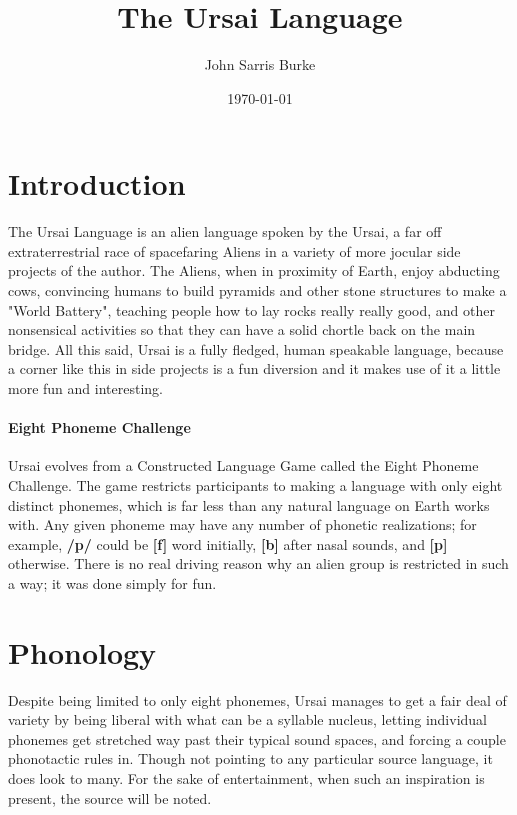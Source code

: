 \documentclass[11pt,letterpaper]{article}
\title{The Ursai Language}
\date{\today}
\author{John Sarris Burke}
\begin{document}
\maketitle
\tableofcontents
\pagebreak
\listoffigures
\pagebreak

\section{Introduction}
	The Ursai Language is an alien language spoken by the Ursai, a far off extraterrestrial race of spacefaring Aliens in a variety of more jocular side projects of the author.  The Aliens, when in proximity of Earth, enjoy abducting cows, convincing humans to build pyramids and other stone structures to make a "World Battery", teaching people how to lay rocks really really good, and other nonsensical activities so that they can have a solid chortle back on the main bridge. All this said, Ursai is a fully fledged, human speakable language, because a corner like this in side projects is a fun diversion and it makes use of it a little more fun and interesting.  
	\paragraph{Eight Phoneme Challenge}
	Ursai evolves from a Constructed Language Game called the Eight Phoneme Challenge.  The game restricts participants to making a language with only eight distinct phonemes, which is far less than any natural language on Earth works with.  Any given phoneme may have any number of phonetic realizations; for example, \textbf{/p/} could be \textbf{[f]} word initially, \textbf{[b]} after nasal sounds, and \textbf{[p]} otherwise.  There is no real driving reason why an alien group is restricted in such a way; it was done simply for fun.

\pagebreak
\section{Phonology}
	Despite being limited to only eight phonemes, Ursai manages to get a fair deal of variety by being liberal with what can be a syllable nucleus, letting individual phonemes get stretched way past their typical sound spaces, and forcing a couple phonotactic rules in.  Though not pointing to any particular source language, it does look to many.  For the sake of entertainment, when such an inspiration is present, the source will be noted.
\end{document}
